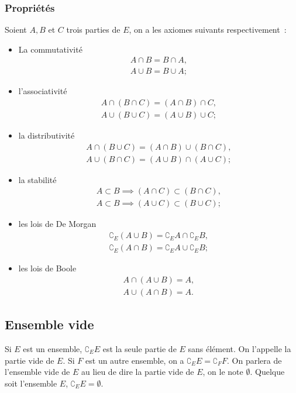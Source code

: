 \subsubsection{Propriétés}
\label{chap3-subsubsec:prop}
\begin{axiome}
  Soient \(A, B\) et \(C\) trois parties de \(E\), on a les axiomes suivants respectivement~:
  \begin{itemize}
    \item La commutativité
        \begin{gather}
            A \cap B= B \cap A, \\  
            A \cup B=B \cup A;
        \end{gather}
    \item l'associativité
        \begin{gather}
            A \cap (B \cap C)=(A \cap B) \cap C, \\ 
            A \cup (B \cup C)=(A \cup B) \cup C;
        \end{gather}
    \item la distributivité
        \begin{gather}
            A \cap (B \cup C)=(A \cap B) \cup (B \cap C), \\ 
            A \cup (B \cap C)=(A \cup B) \cap (A \cup C);
        \end{gather}
    \item la stabilité
        \begin{gather}
            A \subset B \implies (A \cap C) \subset (B \cap C), \\ 
            A \subset B \implies (A \cup C) \subset (B \cup C);
        \end{gather}
    \item les lois de De Morgan
        \begin{gather}
            \complement_E (A \cup B)=\complement_E A \cap \complement_E B, \\ 
            \complement_E (A \cap B)=\complement_E A \cup \complement_E B;
        \end{gather}
    \item les lois de Boole
        \begin{gather}
            A \cap (A \cup B)=A, \\ 
            A \cup (A \cap B)=A.
        \end{gather}
    \end{itemize}
\end{axiome}
%
\subsection{Ensemble vide}
\label{chap3-subsec:ensemblevide}
Si \(E\) est un ensemble, \(\complement_E E\) est la seule partie de \(E\) sans élément. On l'appelle la partie vide de \(E\). Si \(F\) est un autre ensemble, on a \(\complement_E E = \complement_F F\). On parlera de l'ensemble vide de \(E\) au lieu de dire la partie vide de \(E\), on le note \(\emptyset\). Quelque soit l'ensemble \(E\), \(\complement_E E =\emptyset\).

